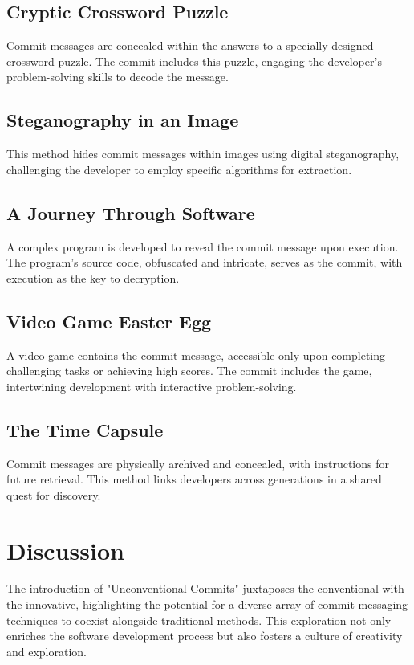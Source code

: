 \documentclass[12pt]{article}
\begin{document}
    \subsection{Cryptic Crossword Puzzle}
        Commit messages are concealed within the answers to a specially designed crossword puzzle. The commit includes this puzzle, engaging the developer's problem-solving skills to decode the message.

    \subsection{Steganography in an Image}
        This method hides commit messages within images using digital steganography, challenging the developer to employ specific algorithms for extraction.

    \subsection{A Journey Through Software}
        A complex program is developed to reveal the commit message upon execution. The program's source code, obfuscated and intricate, serves as the commit, with execution as the key to decryption.

    \subsection{Video Game Easter Egg}
        A video game contains the commit message, accessible only upon completing challenging tasks or achieving high scores. The commit includes the game, intertwining development with interactive problem-solving.

    \subsection{The Time Capsule}
        Commit messages are physically archived and concealed, with instructions for future retrieval. This method links developers across generations in a shared quest for discovery.

\section{Discussion}
    The introduction of "Unconventional Commits" juxtaposes the conventional with the innovative, highlighting the potential for a diverse array of commit messaging techniques to coexist alongside traditional methods. This exploration not only enriches the software development process but also fosters a culture of creativity and exploration.
\end{document}
